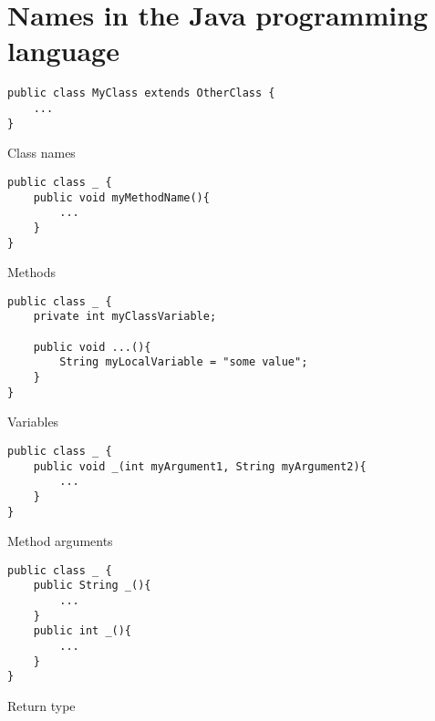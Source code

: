 \section{Names in the Java programming language}
\label{appendix:java-nameabe-examples}

\begin{code}
\begin{verbatim}
public class MyClass extends OtherClass {
	...
}
\end{verbatim}
\caption{Class names}
\label{lst:example-class-names}
\end{code}

\begin{code}
\begin{verbatim}
public class _ {
	public void myMethodName(){
		...
	}
}
\end{verbatim}
\caption{Methods}
\label{lst:example-methods}
\end{code}

\begin{code}
\begin{verbatim}
public class _ {
	private int myClassVariable;
	
	public void ...(){
		String myLocalVariable = "some value";
	}
}
\end{verbatim}
\caption{Variables}
\label{lst:example-variables}
\end{code}

\begin{code}
\begin{verbatim}
public class _ {
	public void _(int myArgument1, String myArgument2){
		...
	}
}
\end{verbatim}
\caption{Method arguments}
\label{lst:example-method-arguments}
\end{code}

\begin{code}
\begin{verbatim}
public class _ {
	public String _(){
		...
	}
	public int _(){
		...
	}
}
\end{verbatim}
\caption{Return type}
\label{lst:example-return-types}
\end{code}
